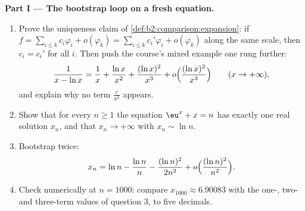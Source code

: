\begin{problem}
\label{pb:b2:comparison:1}

\medskip
\noindent\textbf{Part I --- The bootstrap loop on a fresh
equation.}
\begin{enumerate}
  \item Prove the uniqueness claim of
        \cref{def:b2:comparison:expansion}: if $f = \sum_{i\leq
        k} c_i\varphi_i + o(\varphi_k) = \sum_{i \leq k}
        c_i'\varphi_i + o(\varphi_k)$ along the same scale, then
        $c_i = c_i'$ for all $i$. Then push the course's mixed
        example one rung further:
        \[
        \frac{1}{x - \ln x} = \frac1x + \frac{\ln x}{x^2} +
        \frac{(\ln x)^2}{x^3} + o\Bigl(\frac{(\ln
        x)^2}{x^3}\Bigr) \qquad (x \to +\infty),
        \]
        and explain why no term $\frac{c}{x^2}$ appears.
  \item Show that for every $n \geq 1$ the equation $\eu^x + x =
        n$ has exactly one real solution $x_n$, and that $x_n
        \to +\infty$ with $x_n \sim \ln n$.
  \item Bootstrap twice:
        \[
        x_n = \ln n - \frac{\ln n}{n} - \frac{(\ln n)^2}{2n^2} +
        o\Bigl(\frac{(\ln n)^2}{n^2}\Bigr).
        \]
  \item Check numerically at $n = 1000$: compare $x_{1000}
        \approx 6.90083$ with the one-, two- and three-term
        values of question 3, to five decimals.
\end{enumerate}


\end{problem}
